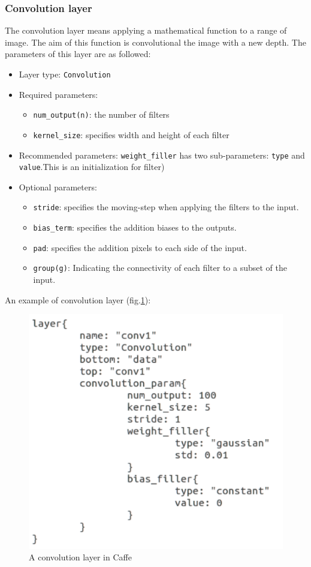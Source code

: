 \subsubsection{Convolution layer}
The convolution layer means applying a mathematical function to a range of image. The aim of this function is convolutional the image with a new depth. The parameters of this layer are as followed:
\begin{itemize}
	\item Layer type: \texttt{Convolution}
	\item Required parameters:
		\begin{itemize}
			\item \texttt{num\_output(n)}: the number of filters
			\item \texttt{kernel\_size}: specifies width and height of each filter
		\end{itemize}
	\item Recommended parameters: \texttt{weight\_filler} has two sub-parameters: \texttt{type} and \texttt{value}.This is an initialization for filter)
	\item Optional parameters:
		\begin{itemize}
			\item \texttt{stride}: specifies the moving-step when applying the filters to the input.
			\item \texttt{bias\_term}: specifies the addition biases to the outputs.
			\item \texttt{pad}: specifies the addition pixels to each side of the input.
			\item \texttt{group(g)}: Indicating the connectivity of each filter to a subset of the input.
		\end{itemize}
\end{itemize}
An example of convolution layer (fig.\ref{figstconv}):
\begin{figure}[!h]
	\centering
	\includegraphics[scale=0.4]{images/stconv}
	\caption{A convolution layer in Caffe}
	\label{figstconv}
\end{figure}
